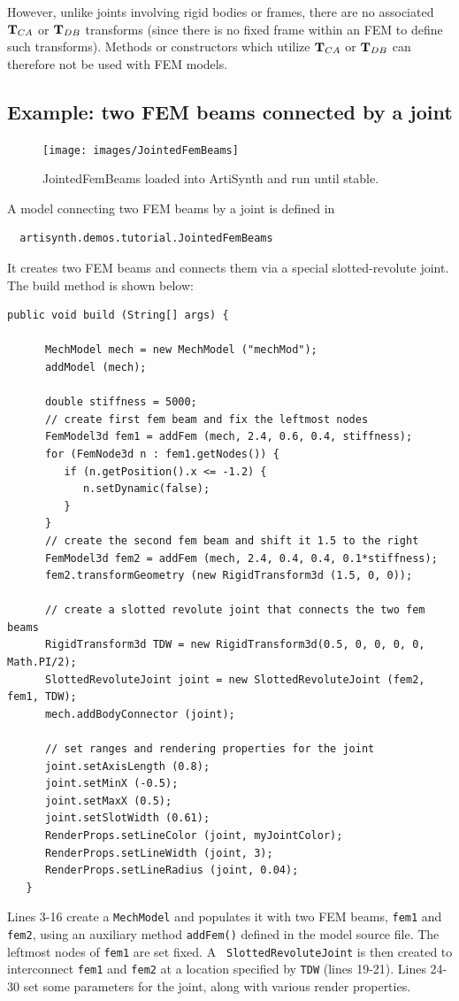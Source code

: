 However, unlike joints involving rigid bodies or frames, there are no
associated ${\bf T}_{CA}$ or ${\bf T}_{DB}$ transforms (since there is no fixed
frame within an FEM to define such transforms).  Methods or
constructors which utilize ${\bf T}_{CA}$ or ${\bf T}_{DB}$ can therefore
not be used with FEM models.

\subsection{Example: two FEM beams connected by a joint}

\begin{figure}[ht]
	\centering
	\texttt{[image: images/JointedFemBeams]}
	\caption{JointedFemBeams loaded into ArtiSynth and run until stable.}
	\label{fig:fem:jointFemBeams}
\end{figure}

A model connecting two FEM beams by a joint
is defined in
%
\begin{verbatim}
  artisynth.demos.tutorial.JointedFemBeams
\end{verbatim}
%
It creates two FEM beams and connects them via a special slotted-revolute
joint. The build method is shown below:
\lstset{numbers=left}
\begin{lstlisting}[]
   public void build (String[] args) {
      
      MechModel mech = new MechModel ("mechMod");
      addModel (mech);
      
      double stiffness = 5000;
      // create first fem beam and fix the leftmost nodes      
      FemModel3d fem1 = addFem (mech, 2.4, 0.6, 0.4, stiffness);
      for (FemNode3d n : fem1.getNodes()) {
         if (n.getPosition().x <= -1.2) {
            n.setDynamic(false);
         }
      }
      // create the second fem beam and shift it 1.5 to the right
      FemModel3d fem2 = addFem (mech, 2.4, 0.4, 0.4, 0.1*stiffness);
      fem2.transformGeometry (new RigidTransform3d (1.5, 0, 0));

      // create a slotted revolute joint that connects the two fem beams
      RigidTransform3d TDW = new RigidTransform3d(0.5, 0, 0, 0, 0, Math.PI/2);
      SlottedRevoluteJoint joint = new SlottedRevoluteJoint (fem2, fem1, TDW);
      mech.addBodyConnector (joint);
      
      // set ranges and rendering properties for the joint
      joint.setAxisLength (0.8);
      joint.setMinX (-0.5);
      joint.setMaxX (0.5);
      joint.setSlotWidth (0.61);
      RenderProps.setLineColor (joint, myJointColor);
      RenderProps.setLineWidth (joint, 3);
      RenderProps.setLineRadius (joint, 0.04);
   }
\end{lstlisting}
\lstset{numbers=none} Lines 3-16 create a {\tt MechModel} and
populates it with two FEM beams, {\tt fem1} and {\tt fem2}, using an
auxiliary method {\tt addFem()} defined in the model source file.  The
leftmost nodes of {\tt fem1} are set fixed. A {\tt
SlottedRevoluteJoint} is then created to interconnect {\tt fem1} and
{\tt fem2} at a location specified by {\tt TDW} (lines 19-21).  Lines
24-30 set some parameters for the joint, along with various render
properties.

